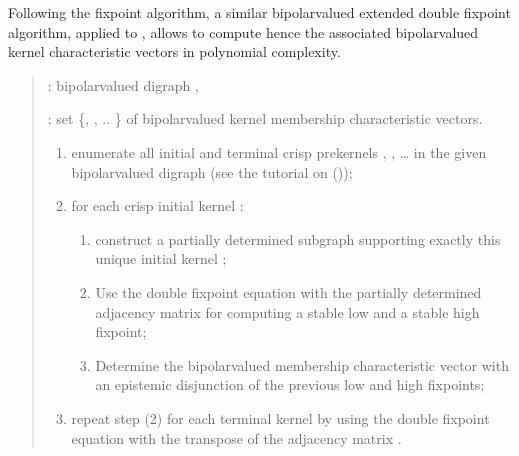 \documentclass[a4paper,12pt,english]{sphinxhowto}
\begin{document}
\sphinxAtStartPar
Following the  fixpoint algorithm, a similar bipolar\sphinxhyphen{}valued extended double fixpoint algorithm, applied to , allows to compute hence the associated bipolar\sphinxhyphen{}valued kernel characteristic vectors  in polynomial complexity.

\sphinxAtStartPar
{}
\begin{quote}

\begin{DUlineblock}{0em}
\item[]   : bipolar\sphinxhyphen{}valued digraph ,
\item[]  : set \{, , .. \} of bipolar\sphinxhyphen{}valued kernel membership characteristic vectors.
\end{DUlineblock}
\begin{enumerate}
%
\item {} 
\sphinxAtStartPar
enumerate all initial and terminal crisp prekernels , , … in the given bipolar\sphinxhyphen{}valued digraph (see the tutorial on {\hyperref[\detokenize{pearls:kernel-tutorial-label}]{}} ());

\item {} 
\sphinxAtStartPar
for each crisp initial kernel :
\begin{enumerate}
%
\item {} 
\sphinxAtStartPar
construct a partially determined subgraph  supporting exactly this unique initial kernel ;

\item {} 
\sphinxAtStartPar
Use the double fixpoint equation  with the partially determined adjacency matrix  for computing a stable low and a stable high fixpoint;

\item {} 
\sphinxAtStartPar
Determine the bipolar\sphinxhyphen{}valued \sphinxhyphen{}membership characteristic vector  with an epistemic disjunction of the previous low and high fixpoints;

\end{enumerate}

\item {} 
\sphinxAtStartPar
repeat step (2) for each terminal kernel  by using the double fixpoint equation  with the transpose of the adjacency matrix .

\end{enumerate}
\end{quote}
\end{document}
